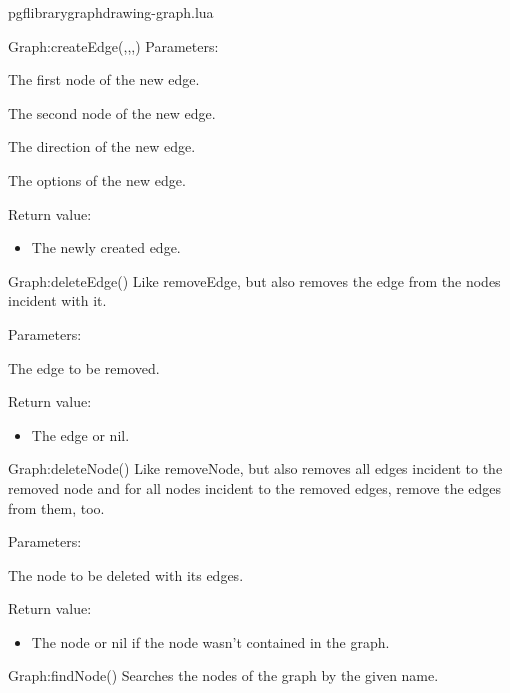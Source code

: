 \begin{filedescription}{pgflibrarygraphdrawing-graph.lua}
\begin{luacommand}{{Graph:createEdge}(,,,)}
Parameters:
\begin{parameterdescription}
	\item[\meta{nodeA}] The first node of the new edge.\item[\meta{nodeB}] The second node of the new edge.\item[\meta{direction}] The direction of the new edge.\item[\meta{options}] The options of the new edge.
\end{parameterdescription}


Return value:
\begin{itemize} \item[] The newly created edge. \end{itemize}


\end{luacommand}\begin{luacommand}{{Graph:deleteEdge}()}
Like removeEdge, but also removes the edge from the nodes incident with it.

Parameters:
\begin{parameterdescription}
	\item[\meta{edge}] The edge to be removed.
\end{parameterdescription}


Return value:
\begin{itemize} \item[] The edge or nil. \end{itemize}


\end{luacommand}\begin{luacommand}{{Graph:deleteNode}()}
Like removeNode, but also removes all edges incident to the removed node and for all nodes incident to the removed edges, remove the edges from them, too.

Parameters:
\begin{parameterdescription}
	\item[\meta{node}] The node to be deleted with its edges.
\end{parameterdescription}


Return value:
\begin{itemize} \item[] The node or nil if the node wasn't contained in the graph. \end{itemize}


\end{luacommand}\begin{luacommand}{{Graph:findNode}()}
Searches the nodes of the graph by the given name.


\end{luacommand}
\end{filedescription}
